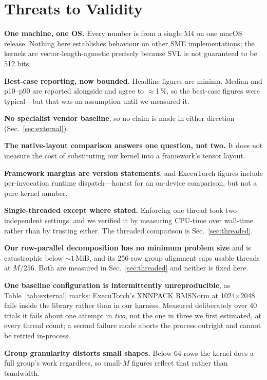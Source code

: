 \documentclass[conference,10pt]{IEEEtran}
\begin{document}
\section{Threats to Validity}

\textbf{One machine, one OS.} Every number is from a single M4 on one macOS
release. Nothing here establishes behaviour on other SME implementations; the
kernels are vector-length-agnostic precisely because SVL is not guaranteed to be
512 bits.

\textbf{Best-case reporting, now bounded.} Headline figures are minima. Median
and p10--p90 are reported alongside and agree to $\approx$1\,\%, so the
best-case figures were typical---but that was an assumption until we measured
it.

\textbf{No specialist vendor baseline}, so no claim is made in either direction
(Sec.~\ref{sec:external}).

\textbf{The native-layout comparison answers one question, not two.} It does not
measure the cost of substituting our kernel into a framework's tensor layout.

\textbf{Framework margins are version statements}, and ExecuTorch figures
include per-invocation runtime dispatch---honest for an on-device comparison,
but not a pure kernel number.

\textbf{Single-threaded except where stated.} Enforcing one thread took two
independent settings, and we verified it by measuring CPU-time over wall-time
rather than by trusting either. The threaded comparison is
Sec.~\ref{sec:threaded}.

\textbf{Our row-parallel decomposition has no minimum problem size} and is
catastrophic below ${\sim}1$\,MiB, and its 256-row group alignment caps usable
threads at $M/256$. Both are measured in Sec.~\ref{sec:threaded} and neither is
fixed here.

\textbf{One baseline configuration is intermittently unreproducible}, as
Table~\ref{tab:external} marks: ExecuTorch's XNNPACK RMSNorm at
1024$\times$2048 fails inside the library rather than in our harness. Measured
deliberately over 40 trials it fails about one attempt in \emph{two}, not the
one in three we first estimated, at every thread count; a second failure mode
aborts the process outright and cannot be retried in-process.

\textbf{Group granularity distorts small shapes.} Below 64 rows the kernel does
a full group's work regardless, so small-$M$ figures reflect that rather than
bandwidth.
\end{document}
